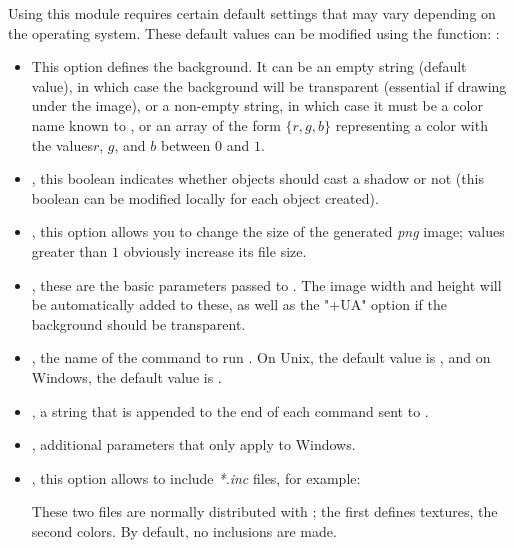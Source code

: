 Using this module requires certain default settings that may vary depending on the operating system. These default values ​​can be modified using the function:
\writeoptions :
\begin{itemize}
\item {} This option defines the background. It can be an empty string (default value), in which case the background will be transparent (essential if drawing under the image), or a non-empty string, in which case it must be a color name known to \povray, or an array of the form $\{r,g,b\}$ representing a color with the values ​​$r$, $g$, and $b$ between $0$ and $1$.

\item {}, this boolean indicates whether objects should cast a shadow or not (this boolean can be modified locally for each object created).

\item {}, this option allows you to change the size of the generated \emph{png} image; values ​​greater than $1$ obviously increase its file size.

\item {}, these are the basic parameters passed to \povray. The image width and height will be automatically added to these, as well as the "+UA" option if the background should be transparent.

\item {}, the name of the command to run \povray. On Unix, the default value is , and on Windows, the default value is .

\item {}, a string that is appended to the end of each command sent to \povray.

\item {}, additional parameters that only apply to Windows.

\item {}, this option allows \povray to include \emph{*.inc} files, for example: \par
\hfil{}\hfil\par These two files are normally distributed with \povray; the first defines textures, the second colors. By default, no inclusions are made.
\end{itemize}

